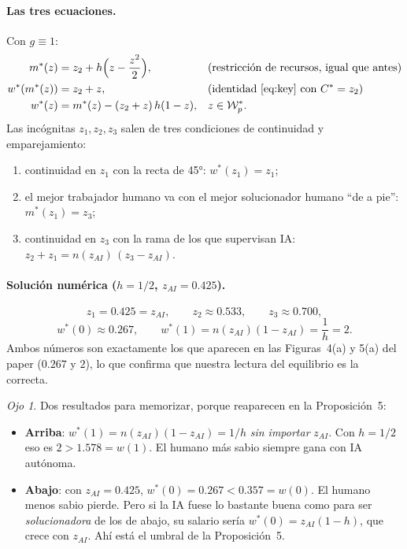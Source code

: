 \documentclass[11pt]{article}
\theoremstyle{definition}
\theoremstyle{remark}
\newtheorem*{ojo}{Ojo}
\newcommand{\zai}{z_{AI}}
\newcommand{\W}{\mathcal W}
\begin{document}
\paragraph{Las tres ecuaciones.} Con $g\equiv1$:
\begin{align}
  m^{*}(z)&=z_2+h\Big(z-\frac{z^{2}}{2}\Big), &&\text{(restricción de recursos, igual que antes)}\\
  w^{*}(m^{*}(z))&=z_2+z, &&\text{(identidad \eqref{eq:key} con } C^{*}=z_2)\\
  w^{*}(z)&=m^{*}(z)-(z_2+z)\,h(1-z), &&z\in\W_p^{*}.
\end{align}
Las incógnitas $z_1,z_2,z_3$ salen de tres condiciones de continuidad y emparejamiento:
\begin{enumerate}[label=(\alph*)]
  \item continuidad en $z_1$ con la recta de 45°: $w^{*}(z_1)=z_1$;
  \item el mejor trabajador humano va con el mejor solucionador humano ``de a pie'': $m^{*}(z_1)=z_3$;
  \item continuidad en $z_3$ con la rama de los que supervisan IA: $z_2+z_1=n(\zai)\,(z_3-\zai)$.
\end{enumerate}

\paragraph{Solución numérica ($h=1/2$, $\zai=0.425$).}
\[
  z_1=0.425=\zai,\qquad z_2\approx0.533,\qquad z_3\approx0.700,
\]
\[
  w^{*}(0)\approx0.267,\qquad w^{*}(1)=n(\zai)(1-\zai)=\frac1h=2 .
\]
Ambos números son exactamente los que aparecen en las Figuras~4(a) y 5(a) del paper ($0.267$ y $2$),
lo que confirma que nuestra lectura del equilibrio es la correcta.

\begin{ojo}
Dos resultados para memorizar, porque reaparecen en la Proposición~5:
\begin{itemize}
  \item \textbf{Arriba}: $w^{*}(1)=n(\zai)(1-\zai)=1/h$ \emph{sin importar} $\zai$. Con $h=1/2$ eso es
  $2>1.578=w(1)$. El humano más sabio siempre gana con IA autónoma.
  \item \textbf{Abajo}: con $\zai=0.425$, $w^{*}(0)=0.267<0.357=w(0)$. El humano menos sabio pierde.
  Pero si la IA fuese lo bastante buena como para ser \emph{solucionadora} de los de abajo, su salario
  sería $w^{*}(0)=\zai(1-h)$, que crece con $\zai$. Ahí está el umbral de la Proposición~5.
\end{itemize}
\end{ojo}
\end{document}
